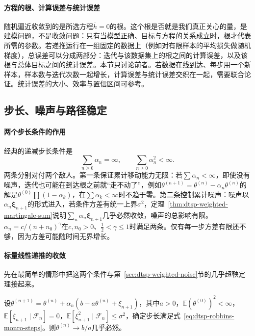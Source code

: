 \paragraph{方程的根、计算误差与统计误差}
随机逼近收敛到的是所选方程$\overline h=0$的根。这个根是否就是我们真正关心的量，是建模问题，不是收敛问题：只有当模型正确、目标与方程的关系成立时，根才代表所需的参数。若递推运行在一组固定的数据上（例如对有限样本的平均损失做随机梯度），总误差可以分成两部分：迭代与该数据集上的根之间的计算误差，以及该根与总体目标之间的统计误差。本节只讨论前者。若数据在线到达、每步用一个新样本，样本数与迭代次数一起增长，计算误差与统计误差交织在一起，需要联合论证。统计误差的大小、效率与置信区间可参考。

\subsection{步长、噪声与路径稳定}
\label{sec:dtsp-stepsizes}

\paragraph{两个步长条件的作用}
经典的递减步长条件是
\begin{equation}
  \sum_{n\geq0}\alpha_n=\infty,\qquad\sum_{n\geq0}\alpha_n^2<\infty.
  \label{eq:dtsp-robbins-monro-steps}
\end{equation}
两条分别对付两个敌人。第一条保证累计移动能力无限：若$\sum\alpha_n<\infty$，即使没有噪声，迭代也可能在到达根之前就“走不动了”，例如$\theta^{(n+1)}=\theta^{(n)}-\alpha_n\theta^{(n)}$的解是$\theta^{(0)}\prod(1-\alpha_k)$，在$\sum\alpha_k<\infty$时不趋于零。第二条控制累计噪声：噪声以$\alpha_n\bm\xi_{n+1}$的形式进入，若条件方差有统一上界$\sigma^2$，定理~\ref{thm:dtsp-weighted-martingale-sum}说明$\sum_n\alpha_n\bm\xi_{n+1}$几乎必然收敛，噪声的总影响有限。$\alpha_n=c/(n+n_0)^\gamma$在$c,n_0>0$、$\frac12<\gamma\leq1$时满足两条。仅有每一步方差有限还不够，因为方差可能随时间无界增长。

\paragraph{标量线性递推的收敛}
先在最简单的情形中把这两个条件与第~\ref{sec:dtsp-weighted-noise}节的几乎超鞅定理接起来。

\begin{theorem}[标量线性随机逼近]
  \label{thm:dtsp-scalar-sa}
  设$\theta^{(n+1)}=\theta^{(n)}+\alpha_n(b-a\theta^{(n)}+\xi_{n+1})$，其中$a>0$，$\mathbb E(\theta^{(0)})^2<\infty$，$\mathbb E[\xi_{n+1}\mid\mathcal F_n]=0$，$\mathbb E[\xi_{n+1}^2\mid\mathcal F_n]\leq\sigma^2$，确定步长满足式~\eqref{eq:dtsp-robbins-monro-steps}。则$\theta^{(n)}\to b/a$几乎必然。
\end{theorem}

